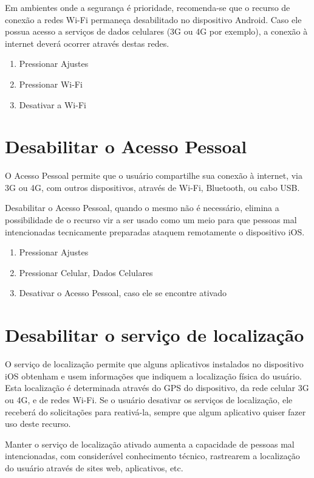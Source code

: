 Em ambientes onde a seguran\c ca \'e prioridade, recomenda-se que o recurso de conex\~ao a redes Wi-Fi permane\c ca desabilitado no dispositivo Android. Caso ele possua acesso a servi\c cos de dados celulares (3G ou 4G por exemplo), a conex\~ao \`a internet dever\'a ocorrer atrav\'es destas redes.

\begin{enumerate}
\item Pressionar Ajustes
\item Pressionar Wi-Fi
\item Desativar a Wi-Fi
\end{enumerate}

\section{Desabilitar o Acesso Pessoal}

O Acesso Pessoal permite que o usu\'ario compartilhe sua conex\~ao \`a internet, via 3G ou 4G, com outros dispositivos, atrav\'es de Wi-Fi, Bluetooth, ou cabo USB. 

Desabilitar o Acesso Pessoal, quando o mesmo n\~ao \'e necess\'ario, elimina a possibilidade de o recurso vir a ser usado como um meio para que pessoas mal intencionadas tecnicamente preparadas ataquem remotamente o dispositivo iOS.

\begin{enumerate}
\item Pressionar Ajustes
\item Pressionar Celular, Dados Celulares
\item Desativar o Acesso Pessoal, caso ele se encontre ativado
\end{enumerate}

\section{Desabilitar o servi\c co de localiza\c c\~ao}

O servi\c co de localiza\c c\~ao permite que alguns aplicativos instalados no dispositivo iOS obtenham e usem informa\c c\~oes que indiquem a localiza\c c\~ao f\'isica do usu\'ario. Esta localiza\c c\~ao \'e determinada atrav\'es do GPS do dispositivo, da rede celular 3G ou 4G, e de redes Wi-Fi. 
Se o usu\'ario desativar os servi\c cos de localiza\c c\~ao, ele receber\'a do solicita\c c\~oes para reativ\'a-la, sempre que algum aplicativo quiser fazer uso deste recurso.

Manter o servi\c co de localiza\c c\~ao ativado aumenta a capacidade de pessoas mal intencionadas, com consider\'avel conhecimento t\'ecnico, rastrearem a localiza\c c\~ao do usu\'ario atrav\'es de sites web, aplicativos, etc.

